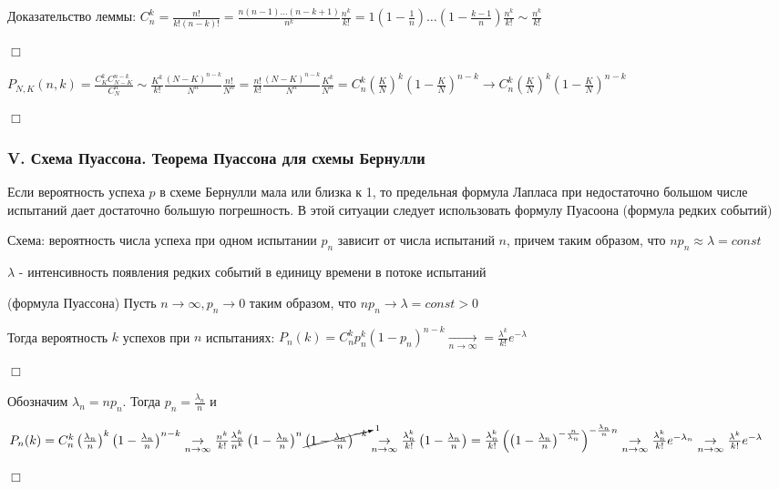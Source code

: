 \documentclass[12pt]{article}
\begin{document}
    Доказательство леммы: $C_n^k = \frac{n!}{k!(n - k)!} = \frac{n(n - 1) \dots (n - k + 1)}{n^k} \frac{n^k}{k!} = 1 \left(1 - \frac{1}{n}\right) \dots \left(1 - \frac{k - 1}{n}\right) \frac{n^k}{k!} \sim \frac{n^k}{k!}$

    \begin{MyProof}
        $\Box$

        $P_{N,K} (n, k) = \frac{C^k_K C_{N - K}^{n - k}}{C^n_N} \sim \frac{K^k}{k!} \frac{(N - K)^{n - k}}{N^n} \frac{n!}{N^n} =
        \frac{n!}{k!} \frac{(N - K)^{n - k}}{N^n} \frac{K^k}{N^n} = C^k_n \left(\frac{K}{N}\right)^k \left(1 - \frac{K}{N}\right)^{n - k} \to C^k_n \left(\frac{K}{N}\right)^k \left(1 - \frac{K}{N}\right)^{n - k} $

        $\Box$
    \end{MyProof}

    \hypertarget{poissonschema}{}

    \subsubsection{V. Схема Пуассона. Теорема Пуассона для схемы Бернулли}

    \Nota Если вероятность успеха $p$ в схеме Бернулли мала или близка к 1, то предельная формула Лапласа при недостаточно большом
    числе испытаний дает достаточно большую погрешность. В этой ситуации следует использовать формулу Пуасоона (формула редких событий)

    Схема: вероятность числа успеха при одном испытании $p_n$ зависит от числа испытаний $n$, причем таким образом, что $n p_n \approx \lambda = const$

    $\lambda$ - интенсивность появления редких событий в единицу времени в потоке испытаний

    \begin{MyTheorem}
         (формула Пуассона) Пусть $n \to \infty, p_n \to 0$ таким образом, что $n p_n \to \lambda = const > 0$

        Тогда вероятность $k$ успехов при $n$ испытаниях: $P_n(k) = C^k_n p_n^k (1 - p_n)^{n - k} \underset{n \to \infty}{\rightarrow} = \frac{\lambda^k}{k!} e^{-\lambda}$
    \end{MyTheorem}

    \begin{MyProof}
        $\Box$

        Обозначим $\lambda_n = n p_n$. Тогда $p_n = \frac{\lambda_n}{n}$ и

        $P_n(k) = C^k_n \left(\frac{\lambda_n}{n}\right)^k \left(1 - \frac{\lambda_n}{n}\right)^{n - k} \underset{n \to \infty}{\rightarrow} \frac{n^k}{k!} \frac{\lambda^k_n}{n^k} \left(1 - \frac{\lambda_n}{n}\right)^n \cancelto{1}{\left(1 - \frac{\lambda_n}{n}\right)^{-k}}
        \underset{n \to \infty}{\rightarrow} \frac{\lambda_n^k}{k!} \left(1 - \frac{\lambda_n}{n}\right) = \frac{\lambda_n^k}{k!} \left(\left(1 - \frac{\lambda_n}{n}\right)^{-\frac{n}{\lambda_n}}\right)^{-\frac{\lambda_n}{n}n} \underset{n \to \infty}{\rightarrow} \frac{\lambda_n^k}{k!} e^{-\lambda_n} \underset{n \to \infty}{\rightarrow} \frac{\lambda^k}{k!} e^{-\lambda}$

        $\Box$
    \end{MyProof}
\end{document}
